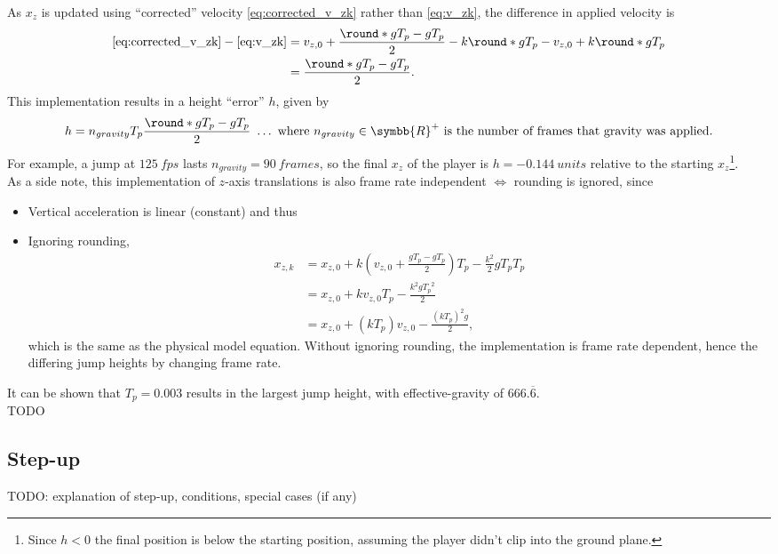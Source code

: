As $x_z$ is updated using ``corrected'' velocity \eqref{eq:corrected_v_zk} rather than \eqref{eq:v_zk}, the difference in applied velocity is
\begin{align*}
\eqref{eq:corrected_v_zk} - \eqref{eq:v_zk} &= v_{z,0} + \frac{\round*{gT_p} - gT_p}{2} - k\round*{gT_p} - v_{z,0} + k\round*{gT_p}\\
&= \frac{\round*{gT_p} - gT_p}{2}.
\end{align*}
This implementation results in a height ``error'' $h$, given by
\begin{align}
\label{eq:height_error}
h = n_{gravity}T_p\frac{\round*{gT_p} - gT_p}{2}\ \ldots\ \text{where $n_{gravity} \in \symbb{R}^+$ is the number of frames that gravity was applied}.
\end{align}
For example, a jump at $\qty{125}{fps}$ lasts $n_{gravity} = \qty{90}{frames}$, so the final $x_z$ of the player is $h = \qty{-0.144}{units}$ relative to the starting $x_z$\footnote{Since $h < 0$ the final position is below the starting position, assuming the player didn't clip into the ground plane.}.\\

As a side note, this implementation of $z$-axis translations is also frame rate independent $\Longleftrightarrow$ rounding is ignored, since
\begin{itemize}
\item
Vertical acceleration is linear (constant) and thus
\item
Ignoring rounding,
\begin{align*}
x_{z,k} &= x_{z,0} + k\left(v_{z,0} + \frac{gT_p - gT_p}{2} \right) T_p - \frac{k^2}{2} gT_p T_p\\
&= x_{z,0} + kv_{z,0} T_p - \frac{k^2 g{T_p}^2}{2}\\
&= x_{z,0} + \left(kT_p \right) v_{z,0} - \frac{\left(kT_p \right)^2 g}{2},
\end{align*}
which is the same as the physical model equation.
Without ignoring rounding, the implementation is frame rate dependent, hence the differing jump heights by changing frame rate.
\end{itemize}

It can be shown that $T_p = 0.003$ results in the largest jump height, with effective-gravity of $666.\overline{6}$.\\
TODO


\subsection{Step-up}
\label{sec:stepup}
TODO: explanation of step-up, conditions, special cases (if any)\\

